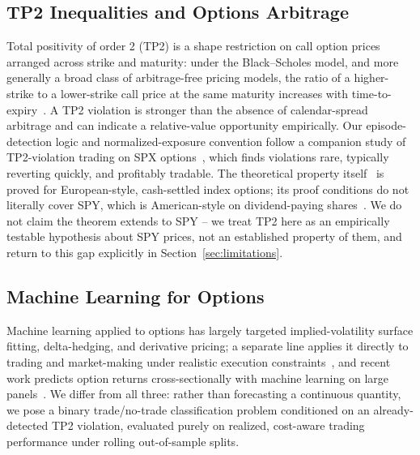 \documentclass[sigconf,review,anonymous]{acmart}
\begin{document}
\subsection{TP2 Inequalities and Options Arbitrage}
Total positivity of order 2 (TP2) is a shape restriction on call option prices arranged across strike and maturity: under the Black--Scholes model, and more generally a broad class of arbitrage-free pricing models, the ratio of a higher-strike to a lower-strike call price at the same maturity increases with time-to-expiry~\cite{glasserman2026tp2theory,glasserman2023convexity}. A TP2 violation is stronger than the absence of calendar-spread arbitrage and can indicate a relative-value opportunity empirically. Our episode-detection logic and normalized-exposure convention follow a companion study of TP2-violation trading on SPX options~\cite{glasserman2025tp2}, which finds violations rare, typically reverting quickly, and profitably tradable. The theoretical property itself~\cite{glasserman2026tp2theory} is proved for European-style, cash-settled index options; its proof conditions do not literally cover SPY, which is American-style on dividend-paying shares~\cite{cosma2020earlyexercise}. We do not claim the theorem extends to SPY -- we treat TP2 here as an empirically testable hypothesis about SPY prices, not an established property of them, and return to this gap explicitly in Section~\ref{sec:limitations}.

\subsection{Machine Learning for Options}
Machine learning applied to options has largely targeted implied-volatility surface fitting, delta-hedging, and derivative pricing; a separate line applies it directly to trading and market-making under realistic execution constraints~\cite{kearns2013mlmicrostructure}, and recent work predicts option returns cross-sectionally with machine learning on large panels~\cite{bali2023option}. We differ from all three: rather than forecasting a continuous quantity, we pose a binary trade/no-trade classification problem conditioned on an already-detected TP2 violation, evaluated purely on realized, cost-aware trading performance under rolling out-of-sample splits.
\end{document}
